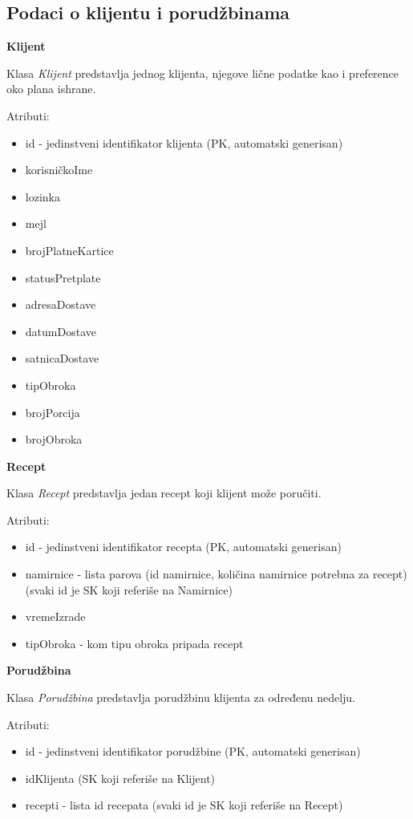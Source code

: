\subsection{Podaci o klijentu i porudžbinama}

\textbf{\large Klijent}
\vspace{0.3cm}

Klasa \textit{Klijent} predstavlja jednog klijenta, njegove lične podatke kao i preference oko plana ishrane.

Atributi:
\begin{itemize}
    \item id - jedinstveni identifikator klijenta (PK, automatski generisan)
    \item korisničkoIme 
    \item lozinka
    \item mejl
    \item brojPlatneKartice
    \item statusPretplate
    \item adresaDostave
    \item datumDostave
    \item satnicaDostave
    \item tipObroka
    \item brojPorcija
    \item brojObroka
\end{itemize}

\textbf{\large Recept}
\vspace{0.3cm}

Klasa \textit{Recept} predstavlja jedan recept koji klijent može poručiti.

Atributi:
\begin{itemize}
    \item id - jedinstveni identifikator recepta (PK, automatski generisan)
    \item namirnice - lista parova (id namirnice, količina namirnice potrebna za recept) (svaki id je SK koji referiše na Namirnice)
    \item vremeIzrade
    \item tipObroka - kom tipu obroka pripada recept
\end{itemize}

\textbf{\large Porudžbina}
\vspace{0.3cm}

Klasa \textit{Porudžbina} predstavlja porudžbinu klijenta za određenu nedelju.

Atributi:
\begin{itemize}
    \item id - jedinstveni identifikator porudžbine (PK, automatski generisan)
    \item idKlijenta (SK koji referiše na Klijent)
    \item recepti - lista id recepata (svaki id je SK koji referiše na Recept)
\end{itemize}

